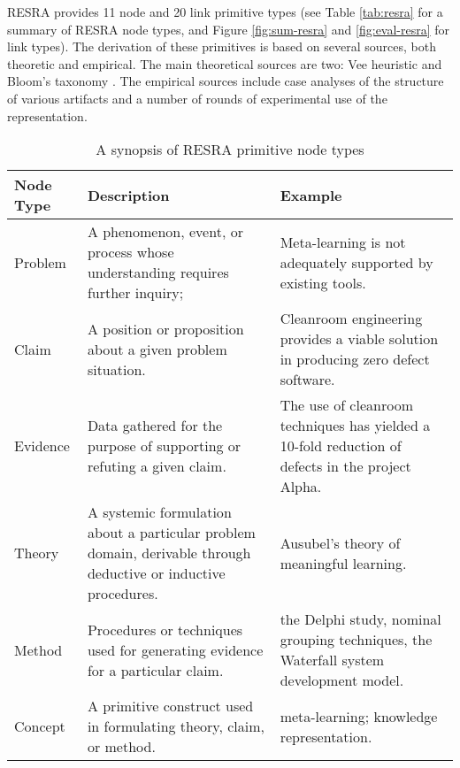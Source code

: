 RESRA provides 11 node and 20 link primitive types (see Table
\ref{tab:resra} for a summary of RESRA node types, and Figure
\ref{fig:sum-resra} and \ref{fig:eval-resra} for link types). The
derivation of these primitives is based on several sources, both theoretic
and empirical. The main theoretical sources are two: Vee heuristic
\cite{Novak84} and Bloom's taxonomy \cite{Bloom56}. The empirical sources
include case analyses of the structure of various artifacts and a number of
rounds of experimental use of the representation.


\small
\begin{table}
  \caption{A synopsis of RESRA primitive node types}
  \begin{center}
    \begin{tabular} {||l|p{2.25in}|p{2.25in}||} \hline   
      {\bf Node Type} & {\bf Description} & {\bf Example} \\ \hline \hline
      
      Problem  & A phenomenon, event, or process whose
      understanding requires further inquiry; & Meta-learning is not
      adequately supported by existing tools. \\ \hline
      
      Claim & A position or proposition about a given problem
      situation.  & Cleanroom engineering provides a viable solution
      in producing zero defect software. \\ \hline
      
      Evidence & Data gathered for the purpose of supporting or
      refuting a given claim. & The use of cleanroom techniques has
      yielded a 10-fold reduction of defects in the project Alpha. \\
      \hline \hline

      Theory & A systemic formulation about a particular problem
      domain, derivable through deductive or inductive procedures. &
      Ausubel's theory of meaningful learning. \\ \hline
      
      Method & Procedures or techniques used for generating evidence
      for a particular claim. & the Delphi study, nominal grouping
      techniques, the Waterfall system development model. \\ \hline
      
      Concept & A primitive construct used in formulating theory,
      claim, or method. & meta-learning; knowledge representation.
      \\ \hline  \hline
      

\end{tabular}
\end{center}
\end{table}
